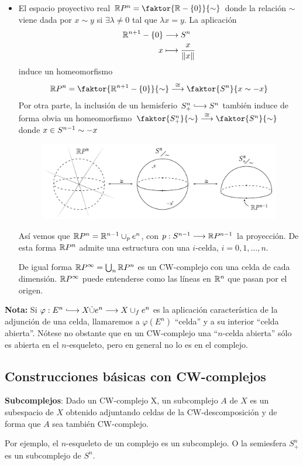 \begin{ejems}
\begin{itemize}
\item El espacio proyectivo real $\mathbb{R}P^n = \faktor{\bb{R}-\{0\}}{\sim}$ donde la relación $\sim$ viene dada por $x \sim y$ si $\exists \lambda \neq 0$ tal que $\lambda x = y$. La aplicación 
\begin{align*}
\bb{R}^{n+1} - \{0\} &\longrightarrow S^n \\
x &\longmapsto \frac{x}{\|x\|}
\end{align*}
induce un homeomorfismo
\[ \bb{R}P^n = \faktor{\bb{R}^{n+1} -\{0\}}{\sim} \stackrel{\cong}{\longrightarrow} \faktor{S^n}{x \sim -x} \]
Por otra parte, la inclusión de un hemisferio $S_+^n \longhookrightarrow S^n$ también induce de forma obvia un homeomorfismo $\faktor{S_+^n}{\sim} \stackrel{\cong}{\longrightarrow} \faktor{S^n}{\sim}$ donde $x \in S^{n-1} \sim \nobreak -x$ \par
\begin{figure}[h]
\centering
\includegraphics[width=\textwidth]{images/proyecreal.pdf}
\end{figure}
\par 
Así vemos que $\mathbb{R}P^n = \mathbb{R}^{n-1} \cup_p e^n$, con $p : S^{n-1} \longrightarrow \bb{R}P^{n-1}$ la proyección. De esta forma $\mathbb{R}P^n$ admite una estructura con una $i$-celda, $i = 0, 1, \ldots ,n$. \par 
De igual forma $\mathbb{R}P^\infty = \bigcup_n \mathbb{R}P^n$ es un CW-complejo con una celda de cada dimensión. $\mathbb{R}P^\infty$ puede entenderse como las líneas en $\mathbb{R}^n$ que pasan por el origen.
\end{itemize}
\textbf{Nota:} Si $\varphi : E^n \longhookrightarrow X \dot{\cup} e^n \longrightarrow X \cup_f e^n$ es la aplicación característica de la adjunción de una celda, llamaremos a $\varphi(E^n)$ ``celda'' y a su interior ``celda abierta''. Nótese no obstante que en un CW-complejo una ``$n$-celda abierta'' sólo es abierta en el $n$-esqueleto, pero en general no lo es en el complejo.
\end{ejems}

\subsection{Construcciones básicas con CW-complejos}
\textbf{Subcomplejos}: Dado un CW-complejo X, un subcomplejo $A$ de $X$ es un subespacio de $X$ obtenido adjuntando celdas de la CW-descomposición y de forma que $A$ sea también CW-complejo. \par
Por ejemplo, el $n$-esqueleto de un complejo es un subcomplejo. O la semiesfera $S_+^n$ es un subcomplejo de $S^n$. \par

